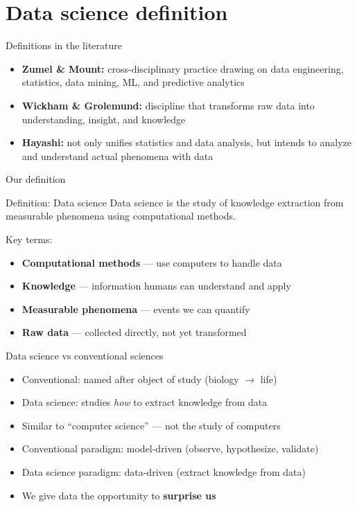 \section{Data science definition}

\begin{frame}{Definitions in the literature}
  \begin{itemize}
    \item \textbf{Zumel \& Mount:} cross-disciplinary practice drawing on data
      engineering, statistics, data mining, ML, and predictive analytics
    \item \textbf{Wickham \& Grolemund:} discipline that transforms raw data into
      understanding, insight, and knowledge
    \item \textbf{Hayashi:} not only unifies statistics and data analysis, but
      intends to analyze and understand actual phenomena with data
  \end{itemize}
\end{frame}

\begin{frame}{Our definition}
  \begin{block}{Definition: Data science}
    Data science is the study of knowledge extraction from measurable phenomena
    using computational methods.
  \end{block}

  \vspace{0.5cm}
  Key terms:
  \begin{itemize}
    \item \textbf{Computational methods} --- use computers to handle data
    \item \textbf{Knowledge} --- information humans can understand and apply
    \item \textbf{Measurable phenomena} --- events we can quantify
    \item \textbf{Raw data} --- collected directly, not yet transformed
  \end{itemize}
\end{frame}

\begin{frame}{Data science vs conventional sciences}
  \begin{itemize}
    \item Conventional: named after object of study (biology $\to$ life)
    \item Data science: studies \textit{how} to extract knowledge from data
    \item Similar to ``computer science'' --- not the study of computers
    \item Conventional paradigm: model-driven (observe, hypothesize, validate)
    \item Data science paradigm: data-driven (extract knowledge from data)
    \item We give data the opportunity to \textbf{surprise us}
  \end{itemize}
\end{frame}


